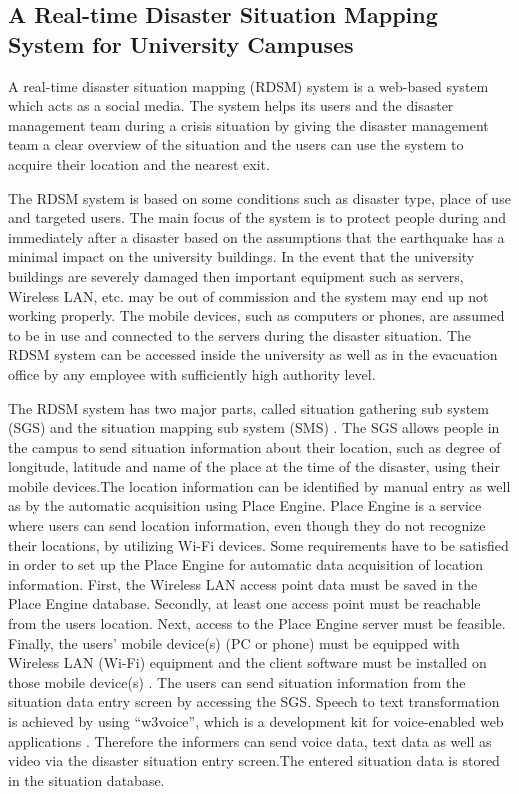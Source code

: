 \subsection{A Real-time Disaster Situation Mapping System for University Campuses}

A real-time disaster situation mapping (RDSM) system is a web-based system which acts as a social media. The system helps its users and the disaster management team during a crisis situation by giving the disaster management team a clear overview of the situation and the users can use the system to acquire their location and the nearest exit.

The RDSM system is based on some conditions such as disaster type, place of use and targeted users. The main focus of the system is to protect people during and immediately after a disaster based on the assumptions that the earthquake has a minimal impact on the university buildings. In the event that the university buildings are severely damaged then important equipment such as servers, Wireless LAN, etc. may be out of commission and the system may end up not working properly. The mobile devices, such as computers or phones, are assumed to be in use and connected to the servers during the disaster situation. The RDSM system can be accessed inside the university as well as in the evacuation office by any employee with sufficiently high authority level.

The RDSM system has two major parts, called situation gathering sub system (SGS) and the situation mapping sub system (SMS) \cite{springlink}. The SGS allows people in the campus to send situation information about their location, such as degree of longitude, latitude and name of the place at the time of the disaster, using their mobile devices.The location information can be identified by manual entry as well as by the automatic acquisition using Place Engine. Place Engine is a service where users can send location information, even though they do not recognize their locations, by utilizing Wi-Fi devices. Some requirements have to be satisfied in order to set up the Place Engine for automatic data acquisition of location information. First, the Wireless LAN access point data must be saved in the Place Engine database. Secondly, at least one access point must be reachable from the users  location. Next, access to the Place Engine server must be feasible. Finally, the users’ mobile device(s) (PC or phone) must be equipped with Wireless LAN (Wi-Fi) equipment and the client software must be installed on those mobile device(s) \cite{springlink}. The users can send situation information from the situation data entry screen by accessing the SGS. Speech to text transformation is achieved by using “w3voice”, which is a development kit for voice-enabled web applications \cite{springlink}. Therefore the informers can send voice data, text data as well as video via the disaster situation entry screen.The entered situation data is stored in the situation database. 


